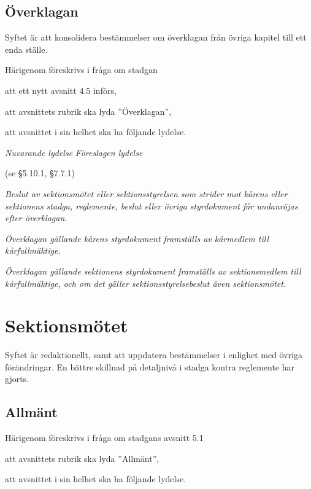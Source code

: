 \documentclass{article}
\newenvironment{lydelse}
    {\begin{paracol}{2}%
        \emph{Nuvarande lydelse}%
        \switchcolumn%
        \emph{Föreslagen lydelse}%
    \end{paracol}%
    \begin{enumerate}[label=\thesubsection.\arabic*]%
    \begin{paracol}{2}%
    }{\end{paracol}\end{enumerate}}
\begin{document}
\subsection{Överklagan}
Syftet är att konsolidera bestämmelser om överklagan från övriga kapitel till ett enda ställe.

Härigenom föreskrivs i fråga om stadgan
\begin{dels}
  \item att ett nytt avsnitt 4.5 införs,
  \item att avsnittets rubrik ska lyda ''Överklagan'',
  \item att avsnittet i sin helhet ska ha följande lydelse.
\end{dels}

\begin{lydelse}
  \item[] (se \S 5.10.1, \S 7.7.1)
  
  \switchcolumn
  \item \emph{Beslut av sektionsmötet eller sektionsstyrelsen som strider mot kårens eller sektionens stadga, reglemente, beslut eller övriga styrdokument får undanröjas efter överklagan.}
  \item \emph{Överklagan gällande kårens styrdokument framställs av kårmedlem till kårfullmäktige.}
  \item \emph{Överklagan gällande sektionens styrdokument framställs av sektionsmedlem till kårfullmäktige, och om det gäller sektionsstyrelsebeslut även sektionsmötet.}
\end{lydelse}

\section{Sektionsmötet}
Syftet är redaktionellt, samt att uppdatera bestämmelser i enlighet med övriga förändringar.
En bättre skillnad på detaljnivå i stadga kontra reglemente har gjorts.

\subsection{Allmänt}
Härigenom föreskrivs i fråga om stadgans avsnitt 5.1
\begin{dels}
    \item att avsnittets rubrik ska lyda ''Allmänt'',
    \item att avsnittet i sin helhet ska ha följande lydelse.
\end{dels}
\end{document}
